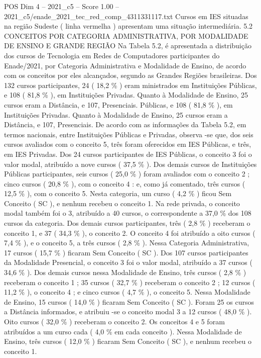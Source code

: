 \begin{textsample}{POS Dim 4 – 2021\_c5 – Score 1.00 – 2021\_c5/enade\_2021\_tec\_red\_comp\_4311331117.txt}
Cursos em IES situadas na região Sudeste ( linha vermelha ) apresentam uma situação intermediária. 5.2 CONCEITOS POR CATEGORIA ADMINISTRATIVA, POR MODALIDADE DE ENSINO E GRANDE REGIÃO Na Tabela 5.2, é apresentada a distribuição dos cursos de Tecnologia em Redes de Computadores participantes do Enade/2021, por Categoria Administrativa e Modalidade de Ensino, de acordo com os conceitos por eles alcançados, segundo as Grandes Regiões brasileiras.
Dos 132 cursos participantes, 24 ( 18,2 \% ) eram ministrados em Instituições Públicas, e 108 ( 81,8 \% ), em Instituições Privadas.
Quanto à Modalidade de Ensino, 25 cursos eram a Distância, e 107, Presenciais.
Públicas, e 108 ( 81,8 \% ), em Instituições Privadas.
Quanto à Modalidade de Ensino, 25 cursos eram a Distância, e 107, Presenciais.
De acordo com as informações da Tabela 5.2, em termos nacionais, entre Instituições Públicas e Privadas, observa -se que, dos seis cursos avaliados com o conceito 5, três foram oferecidos em IES Públicas, e três, em IES Privadas.
Dos 24 cursos participantes de IES Públicas, o conceito 3 foi o valor modal, atribuído a nove cursos ( 37,5 \% ).
Dos demais cursos de Instituições Públicas participantes, seis cursos ( 25,0 \% ) foram avaliados com o conceito 2 ; cinco cursos ( 20,8 \% ), com o conceito 4 : e, como já comentado, três cursos ( 12,5 \% ), com o conceito 5.
Nesta categoria, um curso ( 4,2 \% ) ficou Sem Conceito ( SC ), e nenhum recebeu o conceito 1.
Na rede privada, o conceito modal também foi o 3, atribuído a 40 cursos, o correspondente a 37,0 \% dos 108 cursos da categoria.
Dos demais cursos participantes, três ( 2,8 \% ) receberam o conceito 1, e 37 ( 34,3 \% ), o conceito 2.
O conceito 4 foi atribuído a oito cursos ( 7,4 \% ), e o conceito 5, a três cursos ( 2,8 \% ).
Nessa Categoria Administrativa, 17 cursos ( 15,7 \% ) ficaram Sem Conceito ( SC ).
Dos 107 cursos participantes da Modalidade Presencial, o conceito 3 foi o valor modal, atribuído a 37 cursos ( 34,6 \% ).
Dos demais cursos nessa Modalidade de Ensino, três cursos ( 2,8 \% ) receberam o conceito 1 ; 35 cursos ( 32,7 \% ) receberam o conceito 2 ; 12 cursos ( 11,2 \% ), o conceito 4 ; e cinco cursos ( 4,7 \% ), o conceito 5.
Nessa Modalidade de Ensino, 15 cursos ( 14,0 \% ) ficaram Sem Conceito ( SC ).
Foram 25 os cursos a Distância informados, e atribuiu -se o conceito modal 3 a 12 cursos ( 48,0 \% ).
Oito cursos ( 32,0 \% ) receberam o conceito 2.
Os conceitos 4 e 5 foram atribuídos a um curso cada ( 4,0 \% em cada conceito ).
Nessa Modalidade de Ensino, três cursos ( 12,0 \% ) ficaram Sem Conceito ( SC ), e nenhum recebeu o conceito 1.

\end{textsample}
